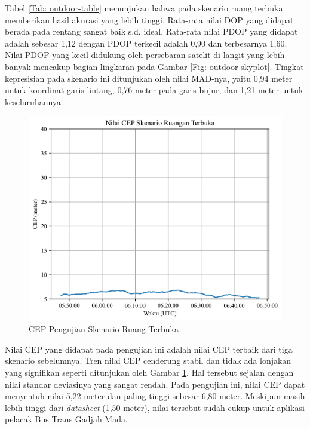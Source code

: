 Tabel \ref{Tab: outdoor-table} menunjukan bahwa pada skenario ruang terbuka memberikan hasil akurasi yang lebih tinggi. Rata-rata nilai DOP yang didapat berada pada rentang sangat baik s.d. ideal. Rata-rata nilai PDOP yang didapat adalah sebesar 1,12 dengan PDOP terkecil adalah 0,90 dan terbesarnya 1,60. Nilai PDOP yang kecil didukung oleh persebaran satelit di langit yang lebih banyak mencakup bagian lingkaran pada Gambar \ref{Fig: outdoor-skyplot}. Tingkat kepresisian pada skenario ini ditunjukan oleh nilai MAD-nya, yaitu 0,94 meter untuk koordinat garis lintang, 0,76 meter pada garis bujur, dan 1,21 meter untuk keseluruhannya.

\begin{figure}[H]
	\centering
	\includegraphics[width=13cm]{contents/chapter-4/4-skenario-outdoor/cep.png}
	\caption{CEP Pengujian Skenario Ruang Terbuka}
	\label{Fig: outdoor-cep}
\end{figure}

Nilai CEP yang didapat pada pengujian ini adalah nilai CEP terbaik dari tiga skenario sebelumnya. Tren nilai CEP cenderung stabil dan tidak ada lonjakan yang signifikan seperti ditunjukan oleh Gambar \ref{Fig: outdoor-cep}. Hal tersebut sejalan dengan nilai standar deviasinya yang sangat rendah. Pada pengujian ini, nilai CEP dapat menyentuh nilai 5,22 meter dan paling tinggi sebesar 6,80 meter. Meskipun masih lebih tinggi dari \textit{datasheet} (1,50 meter), nilai tersebut sudah cukup untuk aplikasi pelacak Bus Trans Gadjah Mada.

